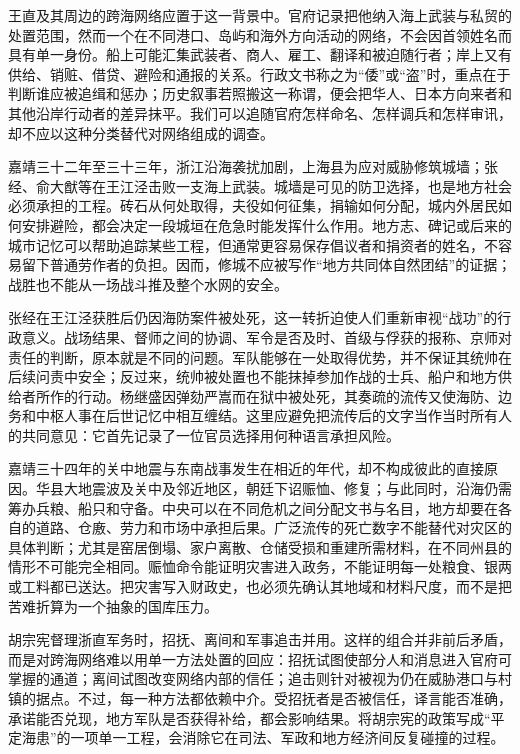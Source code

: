 王直及其周边的跨海网络应置于这一背景中。官府记录把他纳入海上武装与私贸的处置范围，然而一个在不同港口、岛屿和海外方向活动的网络，不会因首领姓名而具有单一身份。船上可能汇集武装者、商人、雇工、翻译和被迫随行者；岸上又有供给、销赃、借贷、避险和通报的关系。行政文书称之为“倭”或“盗”时，重点在于判断谁应被追缉和惩办；历史叙事若照搬这一称谓，便会把华人、日本方向来者和其他沿岸行动者的差异抹平。我们可以追随官府怎样命名、怎样调兵和怎样审讯，却不应以这种分类替代对网络组成的调查。

嘉靖三十二年至三十三年，浙江沿海袭扰加剧，上海县为应对威胁修筑城墙；张经、俞大猷等在王江泾击败一支海上武装。城墙是可见的防卫选择，也是地方社会必须承担的工程。砖石从何处取得，夫役如何征集，捐输如何分配，城内外居民如何安排避险，都会决定一段城垣在危急时能发挥什么作用。地方志、碑记或后来的城市记忆可以帮助追踪某些工程，但通常更容易保存倡议者和捐资者的姓名，不容易留下普通劳作者的负担。因而，修城不应被写作“地方共同体自然团结”的证据；战胜也不能从一场战斗推及整个水网的安全。

张经在王江泾获胜后仍因海防案件被处死，这一转折迫使人们重新审视“战功”的行政意义。战场结果、督师之间的协调、军令是否及时、首级与俘获的报称、京师对责任的判断，原本就是不同的问题。军队能够在一处取得优势，并不保证其统帅在后续问责中安全；反过来，统帅被处置也不能抹掉参加作战的士兵、船户和地方供给者所作的行动。杨继盛因弹劾严嵩而在狱中被处死，其奏疏的流传又使海防、边务和中枢人事在后世记忆中相互缠结。这里应避免把流传后的文字当作当时所有人的共同意见：它首先记录了一位官员选择用何种语言承担风险。

嘉靖三十四年的关中地震与东南战事发生在相近的年代，却不构成彼此的直接原因。华县大地震波及关中及邻近地区，朝廷下诏赈恤、修复；与此同时，沿海仍需筹办兵粮、船只和守备。中央可以在不同危机之间分配文书与名目，地方却要在各自的道路、仓廒、劳力和市场中承担后果。广泛流传的死亡数字不能替代对灾区的具体判断；尤其是窑居倒塌、家户离散、仓储受损和重建所需材料，在不同州县的情形不可能完全相同。赈恤命令能证明灾害进入政务，不能证明每一处粮食、银两或工料都已送达。把灾害写入财政史，也必须先确认其地域和材料尺度，而不是把苦难折算为一个抽象的国库压力。

胡宗宪督理浙直军务时，招抚、离间和军事追击并用。这样的组合并非前后矛盾，而是对跨海网络难以用单一方法处置的回应：招抚试图使部分人和消息进入官府可掌握的通道；离间试图改变网络内部的信任；追击则针对被视为仍在威胁港口与村镇的据点。不过，每一种方法都依赖中介。受招抚者是否被信任，译言能否准确，承诺能否兑现，地方军队是否获得补给，都会影响结果。将胡宗宪的政策写成“平定海患”的一项单一工程，会消除它在司法、军政和地方经济间反复碰撞的过程。

